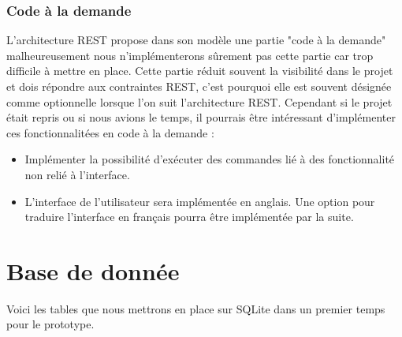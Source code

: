 

\subsubsection{Code à la demande}
L'architecture REST propose dans son modèle une partie "code à la demande" malheureusement nous n'implémenterons sûrement pas cette partie car trop difficile à mettre en place. Cette partie réduit souvent la visibilité dans le projet et dois répondre aux contraintes REST, c'est pourquoi elle est souvent désignée comme optionnelle lorsque l'on suit l'architecture REST. Cependant si le projet était repris ou si nous avions le temps, il pourrais être intéressant d'implémenter ces fonctionnalitées en code à la demande :  
\begin{itemize}
    \item Implémenter la possibilité d'exécuter des commandes lié à des fonctionnalité non relié à l'interface.
    \item L'interface de l'utilisateur sera implémentée en anglais. Une option pour traduire l'interface en français pourra être implémentée par la suite.
\end{itemize}

\section{Base de donnée}

Voici les tables que nous mettrons en place sur SQLite dans un premier temps pour le prototype.

\vspace{2em}

